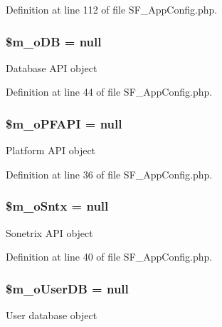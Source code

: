 Definition at line 112 of file SF\_\-AppConfig.php.

\hypertarget{classSF__AppConfig_af0fd242fc474881efab473522eec0748}{
\subsubsection[{\$m\_\-oDB}]{\setlength{\rightskip}{0pt plus 5cm}\$m\_\-oDB = null}}
\label{classSF__AppConfig_af0fd242fc474881efab473522eec0748}
Database API object 

Definition at line 44 of file SF\_\-AppConfig.php.

\hypertarget{classSF__AppConfig_a23d5b5190ee32c4eb8fff028844b1fa6}{
\subsubsection[{\$m\_\-oPFAPI}]{\setlength{\rightskip}{0pt plus 5cm}\$m\_\-oPFAPI = null}}
\label{classSF__AppConfig_a23d5b5190ee32c4eb8fff028844b1fa6}
Platform API object 

Definition at line 36 of file SF\_\-AppConfig.php.

\hypertarget{classSF__AppConfig_a22d1091f94c58e3533304abe3eb9e9fe}{
\subsubsection[{\$m\_\-oSntx}]{\setlength{\rightskip}{0pt plus 5cm}\$m\_\-oSntx = null}}
\label{classSF__AppConfig_a22d1091f94c58e3533304abe3eb9e9fe}
Sonetrix API object 

Definition at line 40 of file SF\_\-AppConfig.php.

\hypertarget{classSF__AppConfig_a480a834e33015cc9a001d1d84972bb12}{
\subsubsection[{\$m\_\-oUserDB}]{\setlength{\rightskip}{0pt plus 5cm}\$m\_\-oUserDB = null}}
\label{classSF__AppConfig_a480a834e33015cc9a001d1d84972bb12}
User database object 

